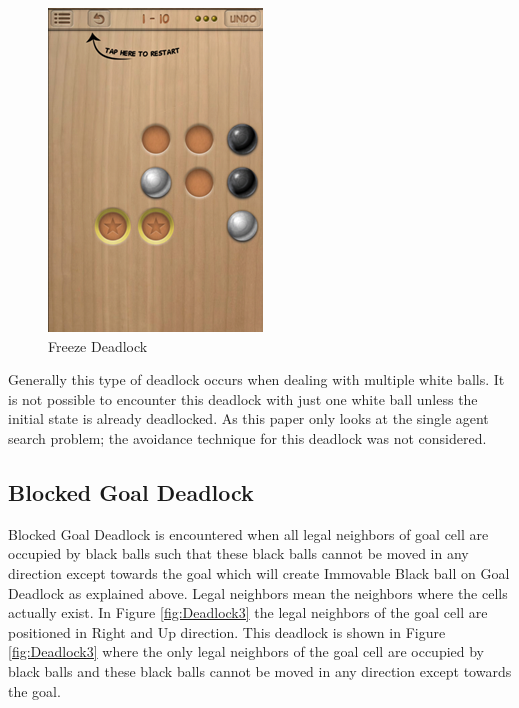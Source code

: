 \documentclass[letterpaper]{article}
\begin{document}
\begin{figure}
\centering
\includegraphics[scale=.5]{Deadlock-2.png} \caption{Freeze Deadlock}
\label{fig:Deadlock2}
\end{figure}

Generally this type of deadlock occurs when dealing with multiple white balls. It is not possible to encounter this deadlock with just one white ball unless the initial state is already deadlocked. As this paper only looks at the single agent search problem; the avoidance technique for this deadlock was not considered. 

\subsection{Blocked Goal Deadlock}
Blocked Goal Deadlock is encountered when all legal neighbors of goal cell are occupied by black balls such that these black balls cannot be moved in any direction except towards the goal which will create Immovable Black ball on Goal Deadlock as explained above.  Legal neighbors mean the neighbors where the cells actually exist. In Figure \ref{fig:Deadlock3} the legal neighbors of the goal cell are positioned in Right and Up direction. This deadlock is shown in Figure \ref{fig:Deadlock3} where the only legal neighbors of the goal cell are occupied by black balls and these black balls cannot be moved in any direction except towards the goal.
\end{document}
